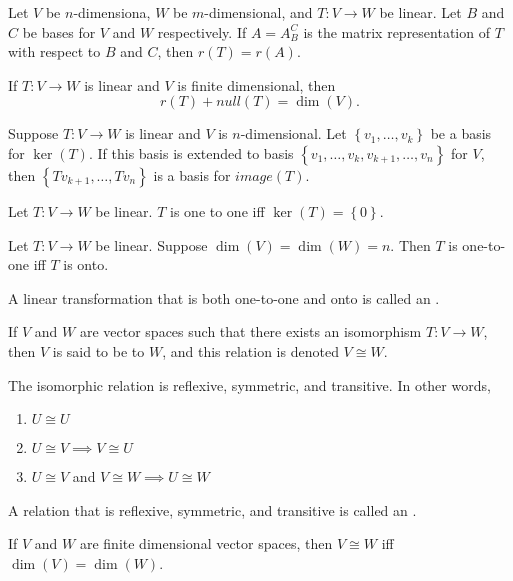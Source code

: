 \begin{theorem}
  Let $V$ be $n$-dimensiona, $W$ be $m$-dimensional, and $T : V \to W$ be linear.
  Let $B$ and $C$ be bases for $V$ and $W$ respectively. If $A = A^{C}_{B}$ is the matrix representation of $T$ with respect to $B$ and $C$, then $r(T) = r(A)$.
\end{theorem}

\begin{theorem}
  If $T : V \to W$ is linear and $V$ is finite dimensional, then
  \begin{equation*}
    r(T) + null(T) = \dim(V).
  \end{equation*}
\end{theorem}

\begin{lemma}
  Suppose $T : V \to W$ is linear and $V$ is $n$-dimensional. Let $\left\{v_{1}, \dots, v_{k}\right\}$ be a basis for $\ker(T)$.
  If this  basis is extended to basis $\left\{v_{1}, \dots, v_{k}, v_{k + 1}, \dots, v_{n}\right\}$ for $V$,
  then $\left\{Tv_{k + 1}, \dots, Tv_{n}\right\}$ is a basis for $image(T)$.
\end{lemma}

\begin{theorem}
  Let $T : V \to W$ be linear. $T$ is one to one iff $\ker(T) = \left\{0\right\}$.
\end{theorem}

\begin{theorem}
  Let $T : V \to W$ be linear. Suppose $\dim(V) = \dim(W) = n$. Then $T$ is one-to-one iff $T$ is onto.
\end{theorem}

\begin{definition}
  A linear transformation that is both one-to-one and onto is called an .

  If $V$ and $W$ are vector spaces such that there exists an isomorphism $T : V \to W$, then $V$ is said to be  to $W$,
  and this relation is denoted $V \cong W$.
\end{definition}

The isomorphic relation is reflexive, symmetric, and transitive. In other words,
\begin{enumerate}[(1)]
  \item $U \cong U$
  \item $U \cong V \implies V \cong U$
  \item $U \cong V$ and $V \cong W \implies U \cong W$
\end{enumerate}

\begin{definition}
  A relation that is reflexive, symmetric, and transitive is called an .
\end{definition}

\begin{theorem}
  If $V$ and $W$ are finite dimensional vector spaces, then $V \cong W$ iff $\dim(V) = \dim(W)$.
\end{theorem}




